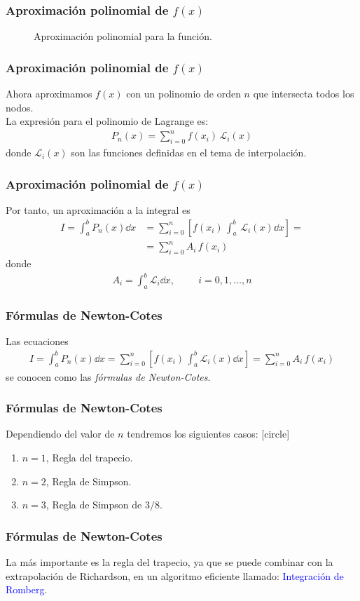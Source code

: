 \begin{frame}
\frametitle{Aproximación polinomial de $f(x)$}
	\begin{figure}
		\centering
		
		\caption{Aproximación polinomial para la función.}
	\end{figure}
\end{frame}
\begin{frame}
\frametitle{Aproximación polinomial de $f(x)$}
Ahora aproximamos $f(x)$ con un polinomio de orden $n$ que intersecta todos los nodos.
\\
\bigskip
\pause
La expresión para el polinomio de Lagrange es:
\begin{align*}
P_{n}(x) = \sum_{i=0}^{n} f(x_{i}) \, \mathcal{L}_{i}(x)
\end{align*}
donde $\mathcal{L}_{i}(x)$ son las funciones definidas en el tema de interpolación. 
\end{frame}
\begin{frame}
\frametitle{Aproximación polinomial de $f(x)$}
Por tanto, un aproximación a la integral es
\begin{align*}
I = \int_{a}^{b} P_{n}(x) \dd{x} &= \sum_{i=0}^{n} \left[ f(x_{i}) \, \int_{a}^{b} \, \mathcal{L}_{i}(x) \dd{x} \right] = \\[0.5em]
&= \sum_{i=0}^{n} A_{i} \, f(x_{i})
\end{align*}
donde
\begin{align*}
A_{i} = \int_{a}^{b} \mathcal{L}_{i} \dd{x}, \hspace{1cm} i = 0, 1, \ldots, n
\end{align*}
\end{frame}
\begin{frame}
\frametitle{Fórmulas de Newton-Cotes}
Las ecuaciones
\fontsize{12}{12}\selectfont
\begin{align*}
I = \int_{a}^{b} P_{n}(x) \dd{x} = \sum_{i=0}^{n} \left[ f(x_{i}) \, \int_{a}^{b} \mathcal{L}_{i}(x) \dd{x} \right] = \sum_{i=0}^{n} A_{i} \, f(x_{i})
\end{align*}
\fontsize{14}{14}\selectfont
\pause
se conocen como las \emph{fórmulas de Newton-Cotes}.
\end{frame}
\begin{frame}
\frametitle{Fórmulas de Newton-Cotes}
Dependiendo del valor de $n$ tendremos los siguientes casos:
[circle]
\begin{enumerate}[<+->]
\item $n = 1$, Regla del trapecio.
\item $n = 2$, Regla de Simpson.
\item $n = 3$, Regla de Simpson de $3/8$.
\end{enumerate}
\end{frame}
\begin{frame}
\frametitle{Fórmulas de Newton-Cotes}
La más importante es la regla del trapecio, ya que se puede combinar con la extrapolación de Richardson, en un algoritmo eficiente llamado: \textcolor{blue}{Integración de Romberg}.
\end{frame}
